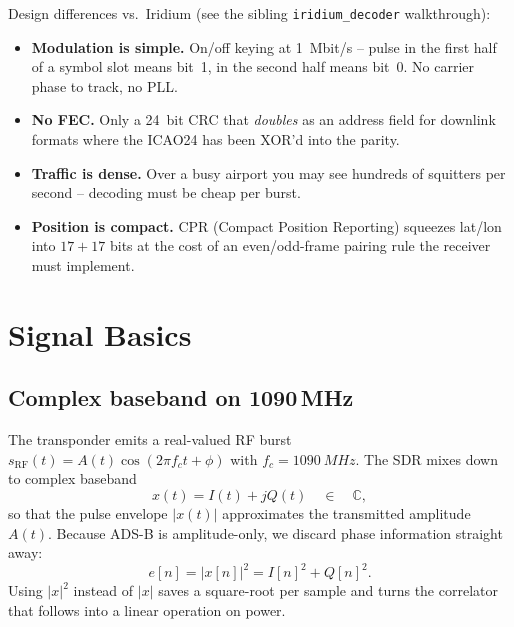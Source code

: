 \documentclass[11pt,a4paper]{article}
\begin{document}
Design differences vs.\ Iridium (see the sibling \texttt{iridium\_decoder}
walkthrough):

\begin{itemize}
  \item \textbf{Modulation is simple.} On/off keying at \SI{1}{Mbit/s} --
        pulse in the first half of a symbol slot means bit~1, in the
        second half means bit~0.  No carrier phase to track, no PLL.
  \item \textbf{No FEC.} Only a \SI{24}{bit} CRC that
        \emph{doubles} as an address field for downlink formats where the
        ICAO24 has been XOR'd into the parity.
  \item \textbf{Traffic is dense.} Over a busy airport you may see hundreds
        of squitters per second -- decoding must be cheap per burst.
  \item \textbf{Position is compact.} CPR (Compact Position Reporting)
        squeezes lat/lon into $17 + 17$ bits at the cost of an
        even/odd-frame pairing rule the receiver must implement.
\end{itemize}

\section{Signal Basics}

\subsection{Complex baseband on 1090\,MHz}

The transponder emits a real-valued RF burst
$s_{\text{RF}}(t) = A(t)\cos(2\pi f_c t + \phi)$
with $f_c = \SI{1090}{MHz}$.  The SDR mixes down to complex baseband
\begin{equation}
x(t) = I(t) + j Q(t)\quad\in\quad\mathbb{C},
\end{equation}
so that the pulse envelope $|x(t)|$ approximates the transmitted
amplitude $A(t)$.  Because ADS-B is amplitude-only, we discard phase
information straight away:
\begin{equation}
e[n] = |x[n]|^{2} = I[n]^{2} + Q[n]^{2}.
\end{equation}
Using $|x|^2$ instead of $|x|$ saves a square-root per sample and turns
the correlator that follows into a linear operation on power.
\end{document}
